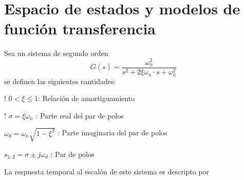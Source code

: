 \newpage
\section{Espacio de estados y modelos de función transferencia}

\begin{definition}
    Sea un sistema de segundo orden
    \begin{equation*}
        G (s) = \dfrac{\omega_n^2}{s^2 + 2 \xi \omega_n \cdot s + \omega_n ^2}
    \end{equation*}
    se definen las siguientes cantidades:
\end{definition}
\begin{bangenumerate}
    \item! \; \; $0 < \textbf{$\xi$} \leq 1 $: Relación de amortiguamiento
    \item! \; \; $\sigma = \xi \omega_n$ : Parte real del par de polos
    \item \; \; $\omega_d = \omega_n \sqrt{1- \xi ^2}$ : Parte imaginaria del par de polos
    \item \; \; $s_{1,2} = \sigma \pm j \omega_d$ : Par de polos 
\end{bangenumerate}

\vspace*{5pt}
La respuesta temporal al escalón de este sistema es descripto por

